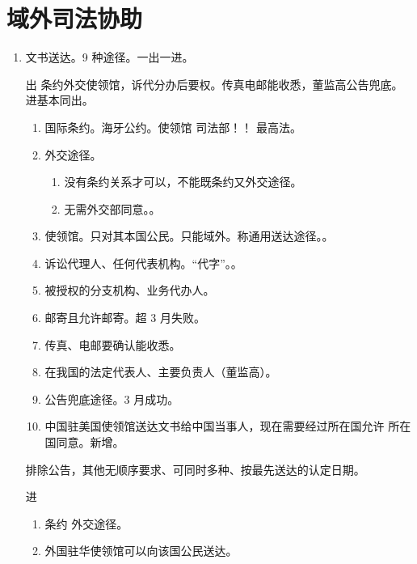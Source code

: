 \section{域外司法协助}
\begin{enumerate}
  \item 文书送达。9 种途径。一出一进。
        \begin{kk}{出}
          条约外交使领馆，诉代分办后要权。传真电邮能收悉，董监高公告兜底。进基本同出。
          \begin{enumerate}
            \item 国际条约。海牙公约。使领馆 \yjt 司法部！！ \yjt 最高法。
            \item 外交途径。
                  \begin{enumerate}
                    \item 没有条约关系才可以，不能既条约又外交途径。
                    \item 无需外交部同意。。
                  \end{enumerate}
            \item 使领馆。只对其本国公民。\sjt 只能域外。\xjt 称通用送达途径。。
            \item 诉讼代理人、任何代表机构。“代字”。。
            \item 被授权的分支机构、业务代办人。
            \item 邮寄且允许邮寄。超 3 月失败。
            \item 传真、电邮要确认能收悉。
            \item 在我国的法定代表人、主要负责人（董监高）。
            \item 公告兜底途径。3 月成功。
            \item 中国驻美国使领馆送达文书给中国当事人，现在需要经过所在国允许 \hz 所在国同意。新增。
          \end{enumerate}
          \tcblower
          排除公告，其他无顺序要求、可同时多种、按最先送达的认定日期。
        \end{kk}

        \begin{kk}{进}
          \begin{enumerate}
            \item 条约 \dy 外交途径。
            \item 外国驻华使领馆可以向该国公民送达。
          \end{enumerate}
        \end{kk}


\end{enumerate}
